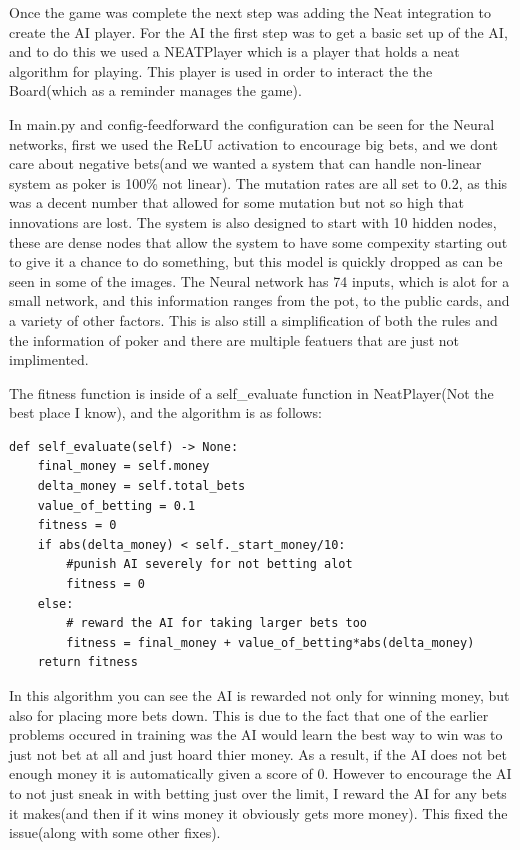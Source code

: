 Once the game was complete the next step was adding the Neat integration to create the AI player. For the AI
the first step was to get a basic set up of the AI, and to do this we used a NEATPlayer which is a player that
holds a neat algorithm for playing. This player is used in order to interact the the Board(which as a reminder
manages the game).

In main.py and config-feedforward the configuration can be seen for the Neural networks, first we used the ReLU
activation to encourage big bets, and we dont care about negative bets(and we wanted a system that can handle
non-linear system as poker is 100\% not linear). The mutation rates are all set to 0.2, as this was a decent
number that allowed for some mutation but not so high that innovations are lost.
The system is also designed to start with 10 hidden nodes, these are dense nodes that allow the system to have
some compexity starting out to give it a chance to do something, but this model is quickly dropped as can be
seen in some of the images. The Neural network has 74 inputs, which is alot for a small network, and this
information ranges from the pot, to the public cards, and a variety of other factors. This is also still a
simplification of both the rules and the information of poker and there are multiple featuers that are just not implimented.

The fitness function is inside of a self\_evaluate function in NeatPlayer(Not the best place I know), and the
algorithm is as follows: 
\begin{verbatim}
def self_evaluate(self) -> None:
    final_money = self.money
    delta_money = self.total_bets
    value_of_betting = 0.1
    fitness = 0
    if abs(delta_money) < self._start_money/10:
        #punish AI severely for not betting alot
        fitness = 0
    else:
        # reward the AI for taking larger bets too
        fitness = final_money + value_of_betting*abs(delta_money)
    return fitness
\end{verbatim}

In this algorithm you can see the AI is rewarded not only for winning money, but also for placing more bets
down. This is due to the fact that one of the earlier problems occured in training was the AI would learn the
best way to win was to just not bet at all and just hoard thier money. As a result, if the AI does not bet
enough money it is automatically given a score of 0. However to encourage the AI to not just sneak in with betting just over the limit, I reward the AI for any bets it makes(and then if it wins money it obviously gets more
money). This fixed the issue(along with some other fixes).

